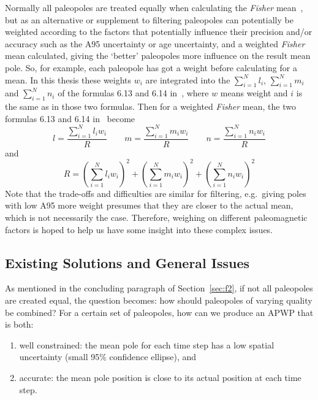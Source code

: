 Normally all paleopoles are treated equally when calculating the \emph{Fisher}
mean~\citep[see how to calculate a \emph{Fisher} mean using the formulas 6.12, 6.13,
6.14 and 6.15 in][chap. 6; note that instead of direction declination and
inclination expected in those formulas, pole longitude and latitude should be
used]{B92}, but as an alternative or supplement to filtering paleopoles can
potentially be weighted according to the factors that potentially influence
their precision and/or accuracy such as the A95 uncertainty or age uncertainty,
and a weighted \emph{Fisher} mean calculated, giving the `better' paleopoles more
influence on the result mean pole. So, for example, each paleopole has got a
weight before calculating for a mean. In this thesis these weights $w_i$
are integrated into the $\sum\limits_{i=1}^N l_i$, $\sum\limits_{i=1}^N m_i$ and
$\sum\limits_{i=1}^N n_i$ of the formulas 6.13 and 6.14 in~\citet[chap.~6]{B92},
where $w$ means weight and $i$ is the same as in those two formulas. Then for a
weighted \emph{Fisher} mean, the two formulas 6.13 and 6.14 in~\citet[chap.~6]{B92}
become
%
\begin{equation}
  l = \frac{\sum\limits_{i=1}^N l_{i}w_i}{R} \quad\quad
  m = \frac{\sum\limits_{i=1}^N m_{i}w_i}{R} \quad\quad
  n = \frac{\sum\limits_{i=1}^N n_{i}w_i}{R}
\end{equation}
%
and
%
\begin{equation}
  R = {\left( \sum\limits_{i=1}^N l_{i}w_i \right)}^2
    + {\left( \sum\limits_{i=1}^N m_{i}w_i \right)}^2
    + {\left( \sum\limits_{i=1}^N n_{i}w_i \right)}^2
\end{equation}
%
Note that the trade-offs and difficulties are similar for filtering, e.g.\
giving poles with low A95 more weight presumes that they are closer to the
actual mean, which is not necessarily the case. Therefore, weighing on different
paleomagnetic factors is hoped to help us have some insight into these complex
issues.

\subsection{Existing Solutions and General Issues}\label{sec:si}

As mentioned in the concluding paragraph of Section~\ref{sec:f2}, if not all
paleopoles are created equal, the question becomes: how should paleopoles of
varying quality be combined? For a certain set of paleopoles, how can we produce
an APWP that is both:
\begin{enumerate}
  \item well constrained: the mean pole for each time step has a low spatial
    uncertainty (small 95\% confidence ellipse), and
  \item accurate: the mean pole position is close to its actual position at each
    time step.
\end{enumerate}

